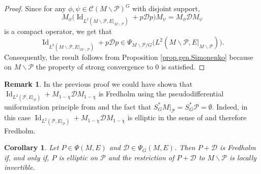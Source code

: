 \documentclass[11pt,a4paper]{amsart}
\newcommand{\maC}{\mathcal C}
\newcommand{\maD}{\mathcal D}
\newcommand{\maP}{\mathcal P}
\newcommand\<{\langle}
\renewcommand\>{\rangle}
\newcommand{\oid}{\operatorname{Id}}
\newtheorem{corollary}[theorem]{Corollary}
\theoremstyle{definition}
\newtheorem{remark}[theorem]{Remark}
\begin{document}
\begin{proof}
Since for any $\phi, \psi \in \maC(M\smallsetminus \maP)^G$ with disjoint support, 
\begin{equation*}
M_\phi\big(\oid_{L^2(M\smallsetminus \maP,E\vert_{M\smallsetminus \maP})} + p \maD p\big) M_\psi=M_\phi \maD M_\psi 
\end{equation*}
is a compact operator, we get that
\begin{equation*}
\oid_{L^2(M\smallsetminus \maP,E\vert_{M\smallsetminus \maP})} + p \maD p \in \Psi_{M\smallsetminus \maP/G}\big(L^2(M\smallsetminus \maP,E\vert_{M\smallsetminus \maP})\big).
\end{equation*}  
Consequently, the result follows from Proposition \ref{prop.gen.Simonenko}
because on $M\smallsetminus \maP$ the property of strong convergence to $0$ is satisfied. 
\end{proof}

\begin{remark}
In the previous proof we could have shown that %
$\oid_{L^2(\maP,E\vert_\maP)} + M_{1-\chi} \maD M_{1-\chi}$ is Fredholm using
the pseudodifferential uniformization principle from \cite{Sternin.unif}
and the fact that $S^*_GM\vert_{\maP}=S^*_G\maP=\emptyset$.
Indeed, in this case $\oid_{L^2(\maP,E\vert_\maP)} + M_{1-\chi} \maD M_{1-\chi}$
is elliptic in the sense of \cite[Definition 5.1]{Sternin.unif} and therefore Fredholm. 
\end{remark}


\begin{corollary}\label{cor.Simonenko.Gop}
Let $P \in \Psi(M,E)$ and $\maD \in \Psi_G(M,E)$.
Then $P + \maD$ is Fredholm if, and only if, $P$ is elliptic on $\maP$ and 
the restriction of $P+\maD$ to $M\smallsetminus \maP$ is locally invertible. 
\end{corollary}
\end{document}

